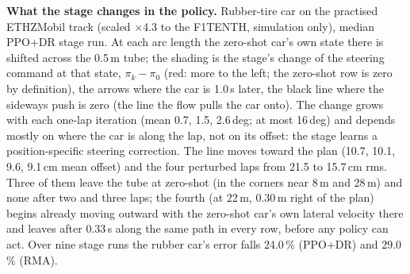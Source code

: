 \caption{\textbf{What the stage changes in the policy.} Rubber-tire car on the practised ETHZMobil track (scaled $\times$4.3 to the
F1TENTH, simulation only), median PPO+DR stage run. At each arc length the zero-shot car's own state there is shifted across the
0.5\,m tube; the shading is the stage's change of the steering command at that state, $\pi_k - \pi_0$ (red: more to the left; the zero-shot
row is zero by definition), the arrows where the car is 1.0\,s later, the black line where the sideways push is zero (the line the flow
pulls the car onto). The change grows with each one-lap iteration (mean 0.7, 1.5, 2.6\,deg; at most 16\,deg) and depends mostly on where
the car is along the lap, not on its offset: the stage learns a position-specific steering correction. The line moves toward the plan
(10.7, 10.1, 9.6, 9.1\,cm mean offset) and the four perturbed laps from 21.5 to 15.7\,cm rms. Three of them leave the tube at
zero-shot (in the corners near 8\,m and 28\,m) and none after two and three laps; the fourth (at 22\,m, 0.30\,m right of the plan) begins
already moving outward with the zero-shot car's own lateral velocity there and leaves after 0.33\,s along the same path in every row,
before any policy can act. Over
nine stage runs the rubber car's error falls 24.0\,\% (PPO+DR) and 29.0\,\% (RMA).}
